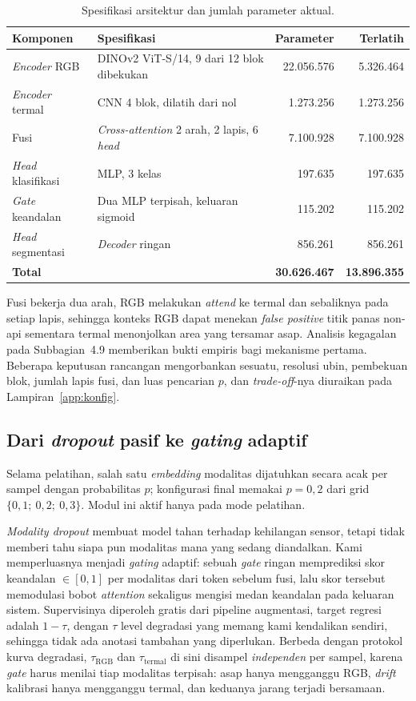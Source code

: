 \begin{table}[!htbp]
\caption{Spesifikasi arsitektur dan jumlah parameter aktual.}
\label{tab:arsitektur}
\centering
\small
\begin{tabular}{llrr}
\hline
\textbf{Komponen} & \textbf{Spesifikasi} & \textbf{Parameter} & \textbf{Terlatih} \\
\hline
\emph{Encoder} RGB & DINOv2 ViT-S/14, 9 dari 12 blok dibekukan & 22.056.576 & 5.326.464 \\
\emph{Encoder} termal & CNN 4 blok, dilatih dari nol & 1.273.256 & 1.273.256 \\
Fusi & \emph{Cross-attention} 2 arah, 2 lapis, 6 \emph{head} & 7.100.928 & 7.100.928 \\
\emph{Head} klasifikasi & MLP, 3 kelas & 197.635 & 197.635 \\
\emph{Gate} keandalan & Dua MLP terpisah, keluaran sigmoid & 115.202 & 115.202 \\
\emph{Head} segmentasi & \emph{Decoder} ringan & 856.261 & 856.261 \\
\hline
\textbf{Total} & & \textbf{30.626.467} & \textbf{13.896.355} \\
\hline
\end{tabular}
\end{table}

Fusi bekerja dua arah, RGB melakukan \emph{attend} ke termal dan sebaliknya
pada setiap lapis, sehingga konteks RGB dapat menekan \emph{false positive}
titik panas non-api sementara termal menonjolkan area yang tersamar asap.
Analisis kegagalan pada Subbagian~4.9 memberikan bukti empiris bagi mekanisme
pertama. Beberapa keputusan rancangan mengorbankan sesuatu, resolusi ubin,
pembekuan blok, jumlah lapis fusi, dan luas pencarian $p$, dan
\emph{trade-off}-nya diuraikan pada Lampiran~\ref{app:konfig}.

\subsection{Dari \emph{dropout} pasif ke \emph{gating} adaptif}

Selama pelatihan, salah satu \emph{embedding} modalitas dijatuhkan secara acak
per sampel dengan probabilitas $p$; konfigurasi final memakai $p = 0{,}2$ dari
grid $\{0{,}1;\ 0{,}2;\ 0{,}3\}$. Modul ini aktif hanya pada mode pelatihan.

\emph{Modality dropout} membuat model tahan terhadap kehilangan sensor, tetapi
tidak memberi tahu siapa pun modalitas mana yang sedang diandalkan. Kami
memperluasnya menjadi \emph{gating} adaptif: sebuah \emph{gate} ringan
memprediksi skor keandalan $\in [0,1]$ per modalitas dari token sebelum fusi,
lalu skor tersebut memodulasi bobot \emph{attention} sekaligus mengisi medan
keandalan pada keluaran sistem. Supervisinya diperoleh gratis dari pipeline
augmentasi, target regresi adalah $1 - \tau$, dengan $\tau$ level degradasi
yang memang kami kendalikan sendiri, sehingga tidak ada anotasi tambahan yang
diperlukan. Berbeda dengan protokol kurva degradasi, $\tau_{\text{RGB}}$ dan
$\tau_{\text{termal}}$ di sini disampel \emph{independen} per sampel, karena
\emph{gate} harus menilai tiap modalitas terpisah: asap hanya mengganggu RGB,
\emph{drift} kalibrasi hanya mengganggu termal, dan keduanya jarang terjadi
bersamaan.

